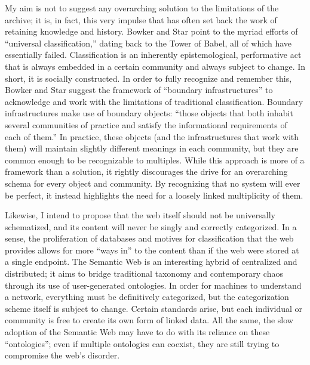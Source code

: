 My aim is not to suggest any overarching solution to the limitations of the archive; it is, in fact, this very impulse that has often set back the work of retaining knowledge and history. Bowker and Star point to the myriad efforts of “universal classification,” dating back to the Tower of Babel, all of which have essentially failed. Classification is an inherently epistemological, performative act that is always embedded in a certain community and always subject to change. In short, it is socially constructed. In order to fully recognize and remember this, Bowker and Star suggest the framework of “boundary infrastructures” to acknowledge and work with the limitations of traditional classification. Boundary infrastructures make use of boundary objects: “those objects that both inhabit several communities of practice and satisfy the informational requirements of each of them.”  In practice, these objects (and the infrastructures that work with them) will maintain slightly different meanings in each community, but they are common enough to be recognizable to multiples. While this approach is more of a framework than a solution, it rightly discourages the drive for an overarching schema for every object and community. By recognizing that no system will ever be perfect, it instead highlights the need for a loosely linked multiplicity of them.

Likewise, I intend to propose that the web itself should not be universally schematized, and its content will never be singly and correctly categorized. In a sense, the proliferation of databases and motives for classification that the web provides allows for more “ways in” to the content than if the web were stored at a single endpoint. The Semantic Web is an interesting hybrid of centralized and distributed; it aims to bridge traditional taxonomy and contemporary chaos through its use of user-generated ontologies. In order for machines to understand a network, everything must be definitively categorized, but the categorization scheme itself is subject to change. Certain standards arise, but each individual or community is free to create its own form of linked data. All the same, the slow adoption of the Semantic Web may have to do with its reliance on these “ontologies”; even if multiple ontologies can coexist, they are still trying to compromise the web’s disorder.

